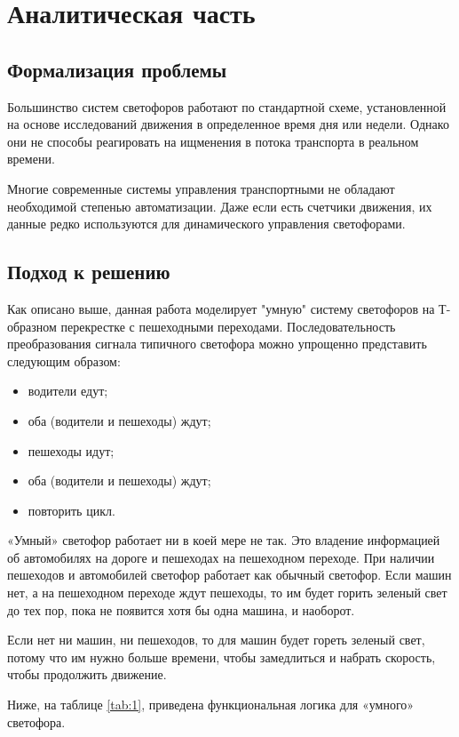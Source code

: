 \section{Аналитическая часть}

\subsection{Формализация проблемы}
Большинство систем светофоров работают по стандартной схеме, установленной на основе исследований движения в определенное время дня или недели. Однако они не способы реагировать на ищменения в потока транспорта в реальном времени. 

Многие современные системы управления транспортными не обладают необходимой степенью автоматизации. Даже если есть счетчики движения, их данные редко используются для динамического управления светофорами.

\subsection{Подход к решению}
Как описано выше, данная работа моделирует "умную" систему светофоров на Т-образном перекрестке с пешеходными переходами. Последовательность преобразования сигнала типичного светофора можно упрощенно представить следующим образом:
\begin{itemize}
    \item водители едут;
    \item оба (водители и пешеходы) ждут;
    \item пешеходы идут;
    \item оба (водители и пешеходы) ждут;
    \item повторить цикл.
\end{itemize}

«Умный» светофор работает ни в коей мере не так. Это владение информацией об автомобилях на дороге и пешеходах на пешеходном переходе. При наличии пешеходов и автомобилей светофор работает как обычный светофор. Если машин нет, а на пешеходном переходе ждут пешеходы, то им будет горить зеленый свет до тех пор, пока не появится хотя бы одна машина, и наоборот.

Если нет ни машин, ни пешеходов, то для машин будет гореть зеленый свет, потому что им нужно больше времени, чтобы замедлиться и набрать скорость, чтобы продолжить движение.

Ниже, на таблице \ref{tab:1}, приведена функциональная логика для «умного» светофора.

